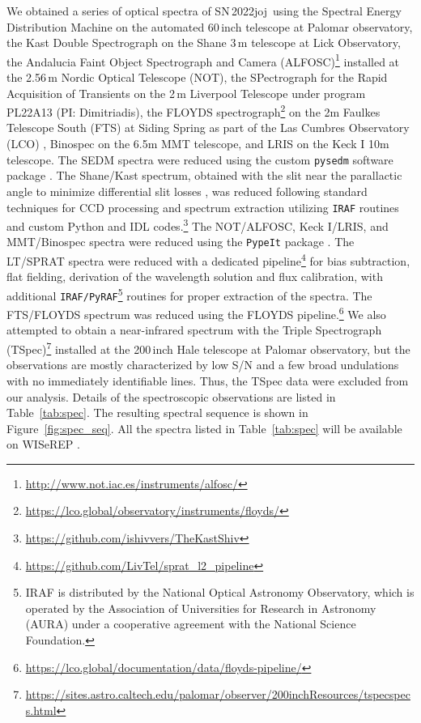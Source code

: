 \documentclass[twocolumn]{aastex631}
\newcommand{\sn}{SN\,2022joj}
\begin{document}
\begin{CJK*}{UTF8}{gbsn}
We obtained a series of optical spectra of \sn\ using 
the Spectral Energy Distribution Machine \citep[SEDM;][]{SEDM_2018} on the automated 60\,inch telescope \citep[P60;][]{P60_2006} at Palomar observatory, 
the Kast Double Spectrograph \citep{miller1994kast} on the Shane 3\,m telescope at Lick Observatory, 
the Andalucia Faint Object Spectrograph and Camera (ALFOSC)\footnote{\url{http://www.not.iac.es/instruments/alfosc/}} installed at the 2.56\,m Nordic Optical Telescope (NOT), 
the SPectrograph for the Rapid Acquisition of Transients \citep[SPRAT;][]{SPRAT_2014} on the 2\,m Liverpool Telescope \citep[LT;][]{LT_2004} under program PL22A13 (PI: Dimitriadis), 
the FLOYDS spectrograph\footnote{\url{https://lco.global/observatory/instruments/floyds/}} on the 2m Faulkes Telescope South (FTS) at Siding Spring as part of the Las Cumbres Observatory (LCO) \citep{LCOGT_2013},
Binospec on the 6.5m MMT telescope, 
and LRIS on the Keck I 10m telescope. 
The SEDM spectra were reduced using the custom \texttt{pysedm} software package \citep{Rigault_pysedm_2019}. 
The Shane/Kast spectrum, obtained with the slit near the parallactic angle to minimize differential slit losses \citep{Shane_1982}, was reduced following standard techniques for CCD processing and spectrum extraction \citep{Silverman_UCBIa_2012} utilizing \texttt{IRAF} \citep{IRAF_1986} routines and custom Python and IDL codes.\footnote{\url{https://github.com/ishivvers/TheKastShiv}} 
The NOT/ALFOSC, Keck I/LRIS, and MMT/Binospec spectra were reduced using the \texttt{PypeIt} package \citep{pypeit:joss_pub}. 
The LT/SPRAT spectra were reduced with a dedicated pipeline\footnote{\url{https://github.com/LivTel/sprat\_l2\_pipeline}} for bias subtraction, flat fielding, derivation of the wavelength solution and flux calibration, with additional \texttt{IRAF/PyRAF}\footnote{IRAF is distributed by the National Optical Astronomy Observatory, which is operated by the Association of Universities for Research in Astronomy (AURA) under a cooperative agreement with the National Science Foundation.} routines for proper extraction of the spectra. 
The FTS/FLOYDS spectrum was reduced using the FLOYDS pipeline.\footnote{\url{https://lco.global/documentation/data/floyds-pipeline/}} 
We also attempted to obtain a near-infrared spectrum with the Triple Spectrograph (TSpec)\footnote{\url{https://sites.astro.caltech.edu/palomar/observer/200inchResources/tspecspecs.html}} installed at the 200\,inch Hale telescope \citep[P200;][]{P200_1982} at Palomar observatory, but the observations are mostly characterized by low S/N and a few broad undulations with no immediately identifiable lines. Thus, the TSpec data were excluded from our analysis.
Details of the spectroscopic observations are listed in Table~\ref{tab:spec}. The resulting spectral sequence is shown in Figure~\ref{fig:spec_seq}. All the spectra listed in Table~\ref{tab:spec} will be available on WISeREP \citep{wiserep_2012}.


\end{CJK*}
\end{document}
